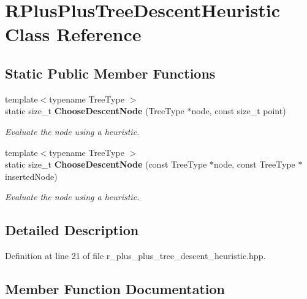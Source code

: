 \section{R\+Plus\+Plus\+Tree\+Descent\+Heuristic Class Reference}
\label{classmlpack_1_1tree_1_1RPlusPlusTreeDescentHeuristic}
\subsection*{Static Public Member Functions}
\begin{DoxyCompactItemize}
\item 
{\footnotesize template$<$typename Tree\+Type $>$ }\\static size\+\_\+t \textbf{ Choose\+Descent\+Node} (Tree\+Type $\ast$node, const size\+\_\+t point)
\begin{DoxyCompactList}\small\item\em Evaluate the node using a heuristic. \end{DoxyCompactList}\item 
{\footnotesize template$<$typename Tree\+Type $>$ }\\static size\+\_\+t \textbf{ Choose\+Descent\+Node} (const Tree\+Type $\ast$node, const Tree\+Type $\ast$inserted\+Node)
\begin{DoxyCompactList}\small\item\em Evaluate the node using a heuristic. \end{DoxyCompactList}\end{DoxyCompactItemize}


\subsection{Detailed Description}


Definition at line 21 of file r\+\_\+plus\+\_\+plus\+\_\+tree\+\_\+descent\+\_\+heuristic.\+hpp.



\subsection{Member Function Documentation}
\mbox{\label{classmlpack_1_1tree_1_1RPlusPlusTreeDescentHeuristic_addab0c2e6048c1ca04f964cbd8f4c4e6}} 
